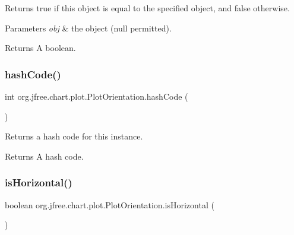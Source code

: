 Returns {\ttfamily true} if this object is equal to the specified object, and {\ttfamily false} otherwise.


\begin{DoxyParams}{Parameters}
{\em obj} & the object ({\ttfamily null} permitted).\\
\hline
\end{DoxyParams}
\begin{DoxyReturn}{Returns}
A boolean. 
\end{DoxyReturn}
\mbox{\label{classorg_1_1jfree_1_1chart_1_1plot_1_1_plot_orientation_a36c6fb99fff2d6ad0809c60a746256bb}} 
\subsubsection{\texorpdfstring{hash\+Code()}{hashCode()}}
{\footnotesize\ttfamily int org.\+jfree.\+chart.\+plot.\+Plot\+Orientation.\+hash\+Code (\begin{DoxyParamCaption}{ }\end{DoxyParamCaption})}

Returns a hash code for this instance.

\begin{DoxyReturn}{Returns}
A hash code. 
\end{DoxyReturn}
\mbox{\label{classorg_1_1jfree_1_1chart_1_1plot_1_1_plot_orientation_a98ce1883cca5bbeda29325d4c667ac7e}} 
\subsubsection{\texorpdfstring{is\+Horizontal()}{isHorizontal()}}
{\footnotesize\ttfamily boolean org.\+jfree.\+chart.\+plot.\+Plot\+Orientation.\+is\+Horizontal (\begin{DoxyParamCaption}{ }\end{DoxyParamCaption})}

